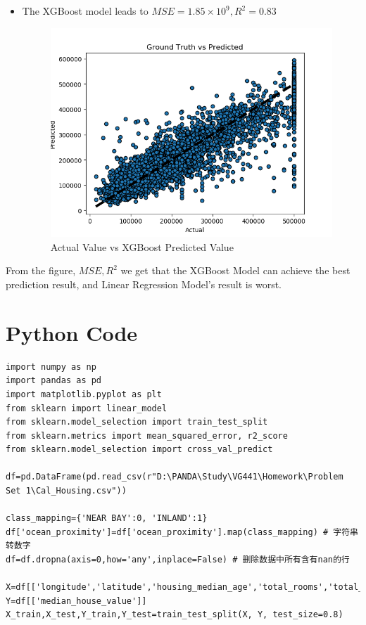 \documentclass[a4paper]{article}
\begin{document}
\begin{itemize}
\begin{figure}[H]
        \caption{Actual Value vs Gradient Boosting Predicted Value}
        \label{GBM}
    \end{figure}
    \item The XGBoost model leads to $MSE=1.85\times10^9, R^2=0.83$
    \begin{figure}[H]
        \centering
        \includegraphics[scale=0.5]{XGBoost.png}
        \caption{Actual Value vs XGBoost Predicted Value}
        \label{XGBoost}
    \end{figure}
\end{itemize}
From the figure, $MSE,R^2$ we get that the XGBoost Model can achieve the best prediction result, and Linear Regression Model's result is worst.
\section*{Python Code}
\begin{verbatim}
import numpy as np
import pandas as pd
import matplotlib.pyplot as plt
from sklearn import linear_model
from sklearn.model_selection import train_test_split
from sklearn.metrics import mean_squared_error, r2_score
from sklearn.model_selection import cross_val_predict

df=pd.DataFrame(pd.read_csv(r"D:\PANDA\Study\VG441\Homework\Problem Set 1\Cal_Housing.csv"))

class_mapping={'NEAR BAY':0, 'INLAND':1}
df['ocean_proximity']=df['ocean_proximity'].map(class_mapping) # 字符串转数字
df=df.dropna(axis=0,how='any',inplace=False) # 删除数据中所有含有nan的行

X=df[['longitude','latitude','housing_median_age','total_rooms','total_bedrooms','population','households','median_income','ocean_proximity']]
Y=df[['median_house_value']]
X_train,X_test,Y_train,Y_test=train_test_split(X, Y, test_size=0.8)
\end{verbatim}
\end{document}
